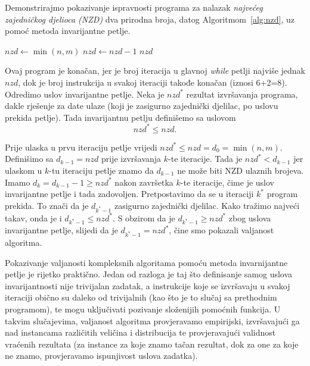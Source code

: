 \begin{example}
Demonstrirajmo   pokazivanje ispravnosti programa za nalazak \textit{najvećeg zajedničkog djelioca (NZD)} dva prirodna broja, datog   Algoritmom~\ref{alg:nzd}, uz pomoć metoda invarijantne petlje.


\begin{algorithm}
	\begin{algorithmic}[1]
		\State $nzd \gets \min(n, m)$
		    \State $nzd \gets nzd - 1$
		\EndWhile
		\State \Return $nzd$
		\EndProcedure
	\end{algorithmic}
   \caption{NZD dva broja.} \label{alg:nzd}
\end{algorithm}

Ovaj program je konačan, jer je broj iteracija u glavnoj \emph{while} petlji najviše jednak $nzd$, dok je broj instrukcija u svakoj iteraciji takođe konačan (iznosi 6+2=8{\tiny }). Odredimo uslov invarijantne petlje. Neka je ${nzd}^*$ rezultat izvršavanja  programa, dakle rješenje za date ulaze (koji je zasigurno zajednički djelilac, po uslovu prekida petlje). Tada  invarijantnu petlju definišemo sa uslovom $$ nzd^* \leq nzd.$$

Prije ulaska u prvu iteraciju petlje vrijedi $nzd^* \leq nzd = d_0 = \min(n, m)$. 
Definišimo sa $d_{k-1} = nzd$  prije izvršavanja $k$-te iteracije. Tada je  $nzd^* < d_{k-1}$ jer  ulaskom u $k$-tu iteraciju petlje znamo da $d_{k-1}$ ne može biti NZD ulaznih brojeva. Imamo $d_{k} = d_{k-1} -1 \geq nzd^*$ nakon završetka $k$-te iteracije, čime je uslov invarijantne petlje i tada zadovoljen.   Pretpostavimo da se u iteraciji $k^*$ program prekida. To znači da je $d_{k^*-1}$ zasigurno zajednički djelilac. Kako tražimo najveći takav, onda je i $d_{k^*-1} \leq nzd^*$. S obzirom da je  $d_{k^*-1} \geq nzd^*$ zbog uslova invarijantne petlje, slijedi da je 
$d_{k^*-1} = nzd^*$, čine smo pokazali valjanost algoritma.
\end{example}
Pokazivanje valjanosti kompleksnih algoritama pomoću metoda invarnijantne petlje je rijetko  praktično. Jedan od razloga je taj što definisanje samog uslova invarijantnosti nije trivijalan zadatak, a instrukcije koje se izvršavaju u svakoj iteraciji obično su daleko od trivijalnih  (kao što je to slučaj sa prethodnim programom), te mogu uključivati  pozivanje složenijih pomoćnih funkcija. U takvim slučajevima, valjanost algoritma provjeravamo empirijski, izvršavajući ga nad instancama različitih veličina i distribucija te provjerava\-jući  validnost vraćenih rezultata (za instance za koje znamo tačan rezultat, dok za one za koje ne znamo, provjeravamo ispunjivost uslova zadatka). 

